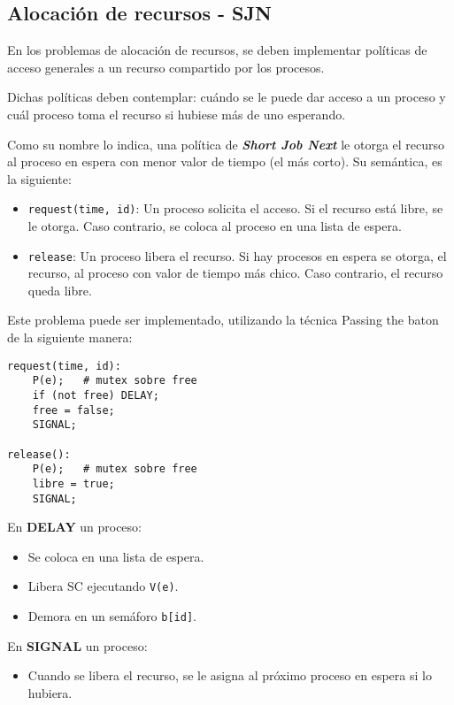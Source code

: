 \documentclass[a4paper, 10pt]{report}
\begin{document}
\subsection{Alocación de recursos - SJN}

En los problemas de alocación de recursos, se deben implementar políticas de acceso generales a un recurso compartido por los procesos.

Dichas políticas deben contemplar: cuándo se le puede dar acceso a un proceso y cuál proceso toma el recurso si hubiese más de uno esperando.

Como su nombre lo indica, una política de \textbf{\emph{Short Job Next}} le otorga el recurso al proceso en espera con menor valor de tiempo (el más corto). Su semántica, es la siguiente:

\begin{itemize}
    \item \lstinline{request(time, id)}: Un proceso solicita el acceso. Si el recurso está libre, se le otorga. Caso contrario, se coloca al proceso en una lista de espera.
    \item \lstinline{release}: Un proceso libera el recurso. Si hay procesos en espera se otorga, el recurso, al proceso con valor de tiempo más chico. Caso contrario, el recurso queda libre.
\end{itemize}

Este problema puede ser implementado, utilizando la técnica Passing the baton de la siguiente manera:

\begin{multicols}{2}

\begin{lstlisting}
request(time, id):
    P(e);   # mutex sobre free
    if (not free) DELAY;
    free = false;
    SIGNAL;

release():
    P(e);   # mutex sobre free
    libre = true;
    SIGNAL;
\end{lstlisting}

\columnbreak

En \textbf{DELAY} un proceso:
\begin{itemize}
    \item Se coloca en una lista de espera.
    \item Libera SC ejecutando \lstinline{V(e)}.
    \item Demora en un semáforo \lstinline{b[id]}.
\end{itemize}

En \textbf{SIGNAL} un proceso:
\begin{itemize}
    \item Cuando se libera el recurso, se le asigna al próximo proceso en espera si lo hubiera.
\end{itemize}
\end{multicols}
\end{document}
